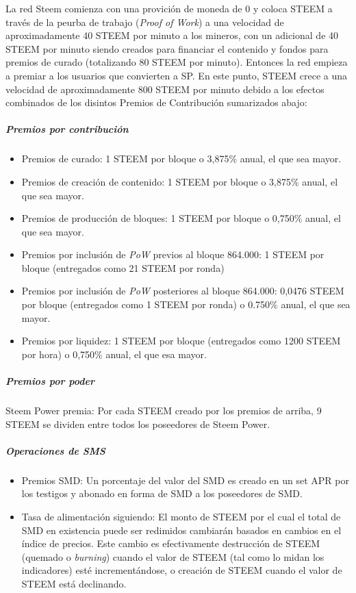\documentclass[a4paper,titlepage,final]{article}
\begin{document}
La red Steem comienza con una provición de moneda de 0 y coloca STEEM a través de la peurba de trabajo (\textit{Proof of Work}) a una velocidad de aproximadamente 40 STEEM por minuto a los mineros, con un adicional de 40 STEEM por minuto siendo creados para financiar el contenido y fondos para premios de curado (totalizando 80 STEEM por minuto). Entonces la red empieza a premiar a los usuarios que convierten a SP. En este punto, STEEM crece a una velocidad de aproximadamente 800 STEEM por minuto debido a los efectos combinados de los disintos Premios de Contribución sumarizados abajo:

\subparagraph{Premios por contribución}

\begin{itemize}
\item Premios de curado: 1 STEEM por bloque o 3,875\% anual, el que sea mayor.
\item Premios de creación de contenido: 1 STEEM por bloque o 3,875\% anual, el que sea mayor.
\item Premios de producción de bloques: 1 STEEM por bloque o 0,750\% anual, el que sea mayor.
\item Premios por inclusión de \textit{PoW }previos al bloque 864.000: 1 STEEM por bloque (entregados como 21 STEEM por ronda)
\item Premios por inclusión de \textit{PoW }posteriores al bloque 864.000: 0,0476 STEEM por bloque (entregados como 1 STEEM por ronda) o 0.750\% anual, el que sea mayor.
\item Premios por liquidez: 1 STEEM por bloque (entregados como 1200 STEEM por hora) o 0,750\% anual, el que esa mayor.
\end{itemize}

\subparagraph{Premios por poder}

Steem Power premia: Por cada STEEM creado por los premios de arriba, 9 STEEM se dividen entre todos los poseedores de Steem Power.

\subparagraph{Operaciones de SMS}

\begin{itemize}
\item Premios SMD: Un porcentaje del valor del SMD es creado en un set APR por los testigos y abonado en forma de SMD a los poseedores de SMD.
\item Tasa de alimentación siguiendo: El monto de STEEM por el cual el total de SMD en existencia puede ser redimidos cambiarán basados en cambios en el índice de precios. Este cambio es efectivamente destrucción de STEEM (quemado o \textit{burning}) cuando el valor de STEEM (tal como lo midan los indicadores) esté incrementándose, o creación de STEEM cuando el valor de STEEM está declinando.
\end{itemize}
\end{document}
